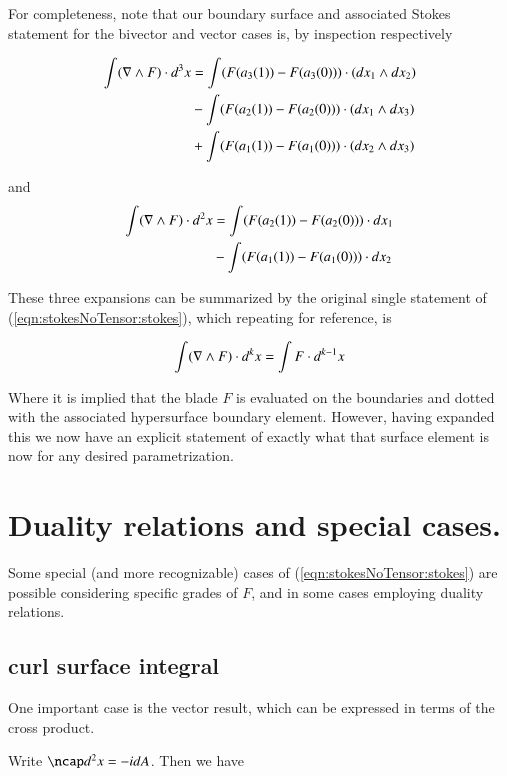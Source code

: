For completeness, note that our boundary surface and associated Stokes statement for the bivector and vector cases is, by inspection respectively

\begin{align*}
\int ( \nabla \wedge F ) \cdot d^3 x 
&= \int (F(a_3(1)) - F(a_3(0))) \cdot ( dx_1 \wedge dx_2 ) \\
&- \int (F(a_2(1)) - F(a_2(0))) \cdot ( dx_1 \wedge dx_3 ) \\
&+ \int (F(a_1(1)) - F(a_1(0))) \cdot ( dx_2 \wedge dx_3 ) \\
\end{align*}

and
\begin{align*}
\int ( \nabla \wedge F ) \cdot d^2 x 
&= \int (F(a_2(1)) - F(a_2(0))) \cdot dx_1 \\
&- \int (F(a_1(1)) - F(a_1(0))) \cdot dx_2 \\
\end{align*}

These three expansions can be summarized by the original single statement of (\ref{eqn:stokesNoTensor:stokes}), which repeating for reference, is

\begin{align*}
\int ( \nabla \wedge F ) \cdot d^k x = \int F \cdot d^{k-1} x 
\end{align*}

Where it is implied that the blade $F$ is evaluated on the boundaries and dotted with the associated hypersurface boundary element.  However, having expanded this we now have an explicit statement of exactly what that surface element is now for any desired parametrization.

\section{Duality relations and special cases.}

Some special (and more recognizable) cases of (\ref{eqn:stokesNoTensor:stokes}) are possible considering specific grades of $F$, and in some cases employing duality relations.  

\subsection{curl surface integral}

One important case is the  vector result, which can be expressed in terms of the cross product.

Write $\ncap d^2 x = -i dA$.  Then we have

